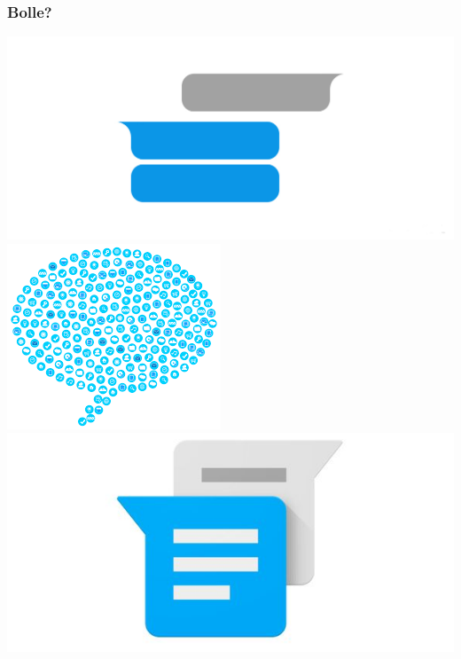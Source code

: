 \begin{frame}
	\frametitle{Bolle?}
    \begin{center}
        \includegraphics[scale=0.20]{img/chat.jpg} \\
        \includegraphics[scale=0.30]{img/bubble.png}
        \includegraphics[scale=0.25]{img/bubble2.jpg}
    \end{center}
\end{frame}

